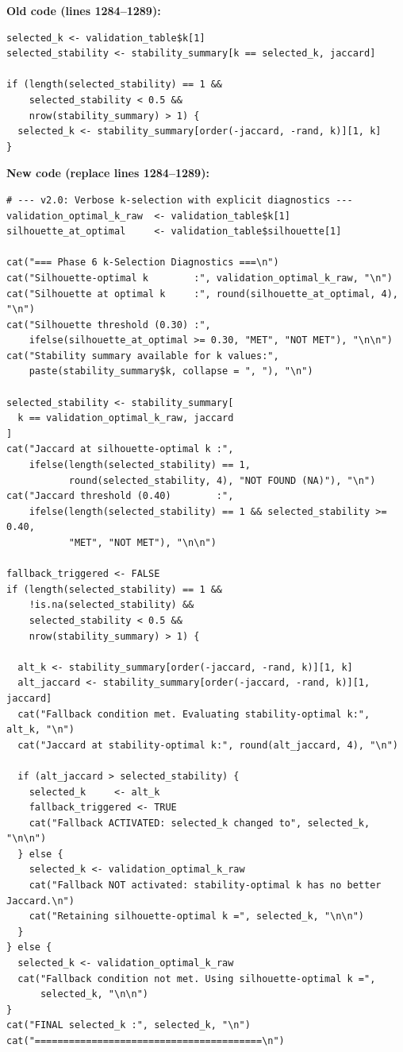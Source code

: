 \documentclass[11pt]{article}
\begin{document}
\textbf{Old code (lines 1284--1289):}
\begin{lstlisting}
selected_k <- validation_table$k[1]
selected_stability <- stability_summary[k == selected_k, jaccard]

if (length(selected_stability) == 1 &&
    selected_stability < 0.5 &&
    nrow(stability_summary) > 1) {
  selected_k <- stability_summary[order(-jaccard, -rand, k)][1, k]
}
\end{lstlisting}

\textbf{New code (replace lines 1284--1289):}
\begin{lstlisting}
# --- v2.0: Verbose k-selection with explicit diagnostics ---
validation_optimal_k_raw  <- validation_table$k[1]
silhouette_at_optimal     <- validation_table$silhouette[1]

cat("=== Phase 6 k-Selection Diagnostics ===\n")
cat("Silhouette-optimal k        :", validation_optimal_k_raw, "\n")
cat("Silhouette at optimal k     :", round(silhouette_at_optimal, 4), "\n")
cat("Silhouette threshold (0.30) :",
    ifelse(silhouette_at_optimal >= 0.30, "MET", "NOT MET"), "\n\n")
cat("Stability summary available for k values:",
    paste(stability_summary$k, collapse = ", "), "\n")

selected_stability <- stability_summary[
  k == validation_optimal_k_raw, jaccard
]
cat("Jaccard at silhouette-optimal k :",
    ifelse(length(selected_stability) == 1,
           round(selected_stability, 4), "NOT FOUND (NA)"), "\n")
cat("Jaccard threshold (0.40)        :",
    ifelse(length(selected_stability) == 1 && selected_stability >= 0.40,
           "MET", "NOT MET"), "\n\n")

fallback_triggered <- FALSE
if (length(selected_stability) == 1 &&
    !is.na(selected_stability) &&
    selected_stability < 0.5 &&
    nrow(stability_summary) > 1) {

  alt_k <- stability_summary[order(-jaccard, -rand, k)][1, k]
  alt_jaccard <- stability_summary[order(-jaccard, -rand, k)][1, jaccard]
  cat("Fallback condition met. Evaluating stability-optimal k:", alt_k, "\n")
  cat("Jaccard at stability-optimal k:", round(alt_jaccard, 4), "\n")

  if (alt_jaccard > selected_stability) {
    selected_k     <- alt_k
    fallback_triggered <- TRUE
    cat("Fallback ACTIVATED: selected_k changed to", selected_k, "\n\n")
  } else {
    selected_k <- validation_optimal_k_raw
    cat("Fallback NOT activated: stability-optimal k has no better Jaccard.\n")
    cat("Retaining silhouette-optimal k =", selected_k, "\n\n")
  }
} else {
  selected_k <- validation_optimal_k_raw
  cat("Fallback condition not met. Using silhouette-optimal k =",
      selected_k, "\n\n")
}
cat("FINAL selected_k :", selected_k, "\n")
cat("========================================\n")
\end{lstlisting}
\end{document}
